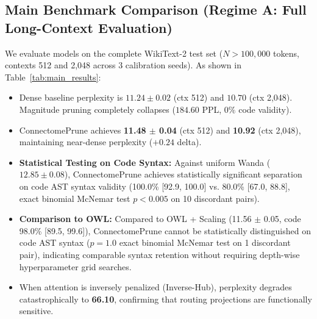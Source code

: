 \documentclass{article}
\begin{document}
\subsection{Main Benchmark Comparison (Regime A: Full Long-Context Evaluation)}
We evaluate models on the complete WikiText-2 test set ($N > 100,000$ tokens, contexts 512 and 2,048 across 3 calibration seeds). As shown in Table~\ref{tab:main_results}:
\begin{itemize}
    \item Dense baseline perplexity is $11.24 \pm 0.02$ (ctx 512) and $10.70$ (ctx 2,048). Magnitude pruning completely collapses ($184.60$ PPL, $0\%$ code validity).
    \item ConnectomePrune achieves \textbf{11.48 $\pm$ 0.04} (ctx 512) and \textbf{10.92} (ctx 2,048), maintaining near-dense perplexity ($+0.24$ delta).
    \item \textbf{Statistical Testing on Code Syntax:} Against uniform Wanda ($12.85 \pm 0.08$), ConnectomePrune achieves statistically significant separation on code AST syntax validity (100.0\% [92.9, 100.0] vs. 80.0\% [67.0, 88.8], exact binomial McNemar test $p < 0.005$ on 10 discordant pairs).
    \item \textbf{Comparison to OWL:} Compared to OWL + Scaling (11.56 $\pm$ 0.05, code 98.0\% [89.5, 99.6]), ConnectomePrune cannot be statistically distinguished on code AST syntax ($p = 1.0$ exact binomial McNemar test on 1 discordant pair), indicating comparable syntax retention without requiring depth-wise hyperparameter grid searches.
    \item When attention is inversely penalized (Inverse-Hub), perplexity degrades catastrophically to \textbf{66.10}, confirming that routing projections are functionally sensitive.
\end{itemize}
\end{document}
